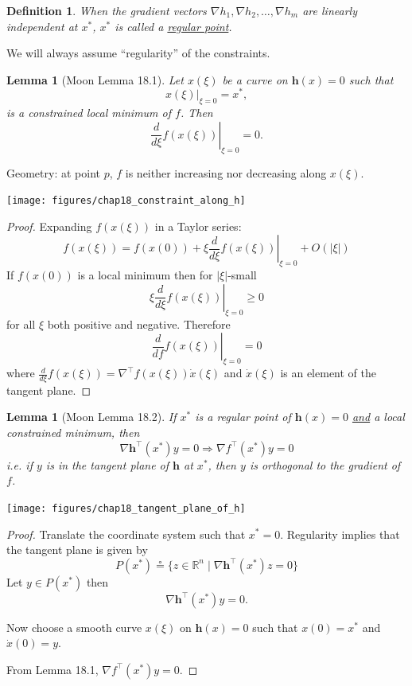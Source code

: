 \documentclass{article}
\newtheorem{lemma}[theorem]{Lemma}
\newtheorem{definition}[theorem]{Definition}
\newcommand{\abs}[1]{\left|{#1}\right|}
\newcommand{\defeq}{\circeq}
\newcommand{\hbf}{\mathbf{h}}
\begin{document}
	\begin{definition}
		When the gradient vectors $\nabla h_1, \nabla h_2, \ldots, \nabla h_m$ are linearly independent at $x^{\ast}$, $x^{\ast}$ is called a \underline{regular point}.	 
	\end{definition}
	
	We will always assume ``regularity'' of the constraints.

	\begin{lemma}[Moon Lemma 18.1]
		Let $x(\xi)$ be a curve on $\hbf(x) = 0$ such that 
		\[
			\left. x(\xi)\right|_{\xi=0} = x^{\ast},
		\] 
		is a constrained local minimum of $f$.		
		Then 
		\[
			\left. \displaystyle\frac{d}{d\xi}f(x(\xi))\right|_{\xi=0} = 0.
		\]		
	\end{lemma}
	Geometry: at point $p$, $f$ is neither increasing nor decreasing along $x(\xi)$.
	\begin{center}
		\texttt{[image: figures/chap18\_constraint\_along\_h]}
	\end{center}
		

	\begin{proof}
		Expanding $f(x(\xi))$ in a Taylor series:
		\[ 
			f(x(\xi)) = \left. f(x(0)) + \xi\frac{d}{d\xi}f(x(\xi))\right|_{\xi=0} + O(|\xi|) 
		\]
		If $f(x(0))$ is a local minimum then for $\abs{\xi}$-small
		\[ 
			\left. \xi\frac{d}{d\xi}f(x(\xi))\right|_{\xi =0} \geq 0 
		\]
		for all $\xi$ both positive and negative.  Therefore
		\[ 
			\left. \frac{d}{df}f(x(\xi))\right|_{\xi=0} = 0 
		\]
		where
		\( 
			\frac{d}{d\xi}f(x(\xi)) = \nabla^\top f(x(\xi)) \dot{x}(\xi)
		\)
		and $\dot{x}(\xi)$ is an element of the tangent plane.
	\end{proof}

	\begin{lemma}[Moon Lemma 18.2]
		If $x^{\ast}$ is a regular point of $\hbf(x) = 0$ \underline{and} a local constrained minimum, then 
		\[ 
			\nabla \hbf^\top (x^{\ast})y = 0 \Rightarrow \nabla f^\top (x^{\ast})y = 0 
		\]
		i.e. if $y$ is in the tangent plane of $\hbf$ at $x^{\ast}$, then $y$ is orthogonal to the gradient of $f$.	
	\end{lemma}
	\begin{center}
		\texttt{[image: figures/chap18\_tangent\_plane\_of\_h]}
	\end{center}	

	\begin{proof}
		Translate the coordinate system such that $x^{\ast} = 0$.  Regularity implies that the tangent plane is given by 
		\[ 
			P(x^{\ast}) \defeq \{ z\in \mathbb{R}^n \mid \nabla \hbf^\top (x^{\ast})z = 0 \} 
		\]
		Let $y \in P(x^{\ast})$ then 
		\[
			\nabla \hbf^\top (x^{\ast}) y = 0.
		\]
		
		
		Now choose a smooth curve $x(\xi)$ on $\hbf(x) = 0$ such that $x(0) = x^{\ast}$ and $\dot{x}(0) = y$.
		
		
		From Lemma 18.1, $\nabla f^\top (x^{\ast})y = 0$. 
	\end{proof}
\end{document}
